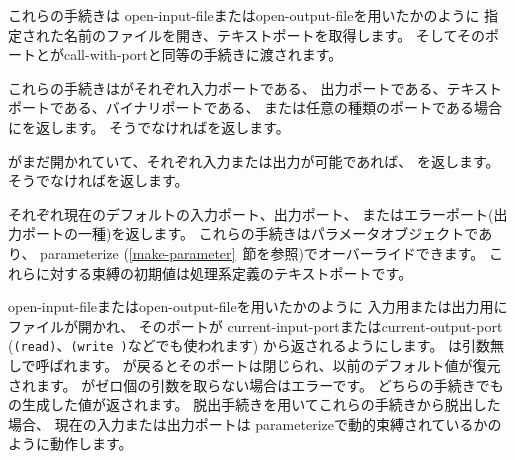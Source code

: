 \begin{entry}{%
}

これらの手続きは
{\cf open-input-file}または{\cf open-output-file}を用いたかのように
指定された名前のファイルを開き、テキストポートを取得します。
そしてそのポートとが{\cf call-with-port}と同等の手続きに渡されます。
\end{entry}

\begin{entry}{%
}

これらの手続きはがそれぞれ入力ポートである、
出力ポートである、テキストポートである、バイナリポートである、
または任意の種類のポートである場合に\schtrue{}を返します。
そうでなければ\schfalse{}を返します。

\end{entry}


\begin{entry}{%
}

がまだ開かれていて、それぞれ入力または出力が可能であれば、
\schtrue{}を返します。 そうでなければ\schfalse{}を返します。


\end{entry}


\begin{entry}{%
}

それぞれ現在のデフォルトの入力ポート、出力ポート、
またはエラーポート(出力ポートの一種)を返します。
これらの手続きはパラメータオブジェクトであり、
{\cf parameterize} (\ref{make-parameter}~節を参照)でオーバーライドできます。
これらに対する束縛の初期値は処理系定義のテキストポートです。

\end{entry}


\begin{entry}{%
}

{\cf open-input-file}または{\cf open-output-file}を用いたかのように
入力用または出力用にファイルが開かれ、
そのポートが
{\cf current-input-port}または{\cf current-output-port}
({\tt (read)}、{\tt (write )}などでも使われます)
から返されるようにします。
は引数無しで呼ばれます。
が戻るとそのポートは閉じられ、以前のデフォルト値が復元されます。
がゼロ個の引数を取らない場合はエラーです。
どちらの手続きでもの生成した値が返されます。
脱出手続きを用いてこれらの手続きから脱出した場合、
現在の入力または出力ポートは
{\cf parameterize}で動的束縛されているかのように動作します。


\end{entry}


